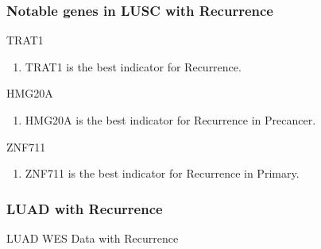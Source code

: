 \documentclass{beamer}
\begin{document}
    \begin{frame}[allowframebreaks]
        \frametitle{Notable genes in LUSC with Recurrence}

        \begin{block}{TRAT1}
            \begin{enumerate}
                \item TRAT1 is the best indicator for Recurrence.
            \end{enumerate}
        \end{block}

        \begin{block}{HMG20A}
            \begin{enumerate}
                \item HMG20A is the best indicator for Recurrence in Precancer.
            \end{enumerate}
        \end{block}

        \begin{block}{ZNF711}
            \begin{enumerate}
                \item ZNF711 is the best indicator for Recurrence in Primary.
            \end{enumerate}
        \end{block}
    \end{frame}

    \begin{frame}
        \frametitle{LUAD with Recurrence}

        \begin{table}
            \caption{LUAD WES Data with Recurrence}
            \resizebox{!}{0.3 \textheight}
            {}
        \end{table}
    \end{frame}
\end{document}
